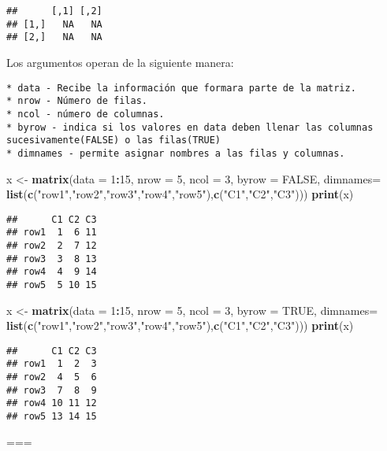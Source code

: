 \documentclass[11pt,]{article}
\newenvironment{Shaded}{\begin{snugshade}}{\end{snugshade}}
\newcommand{\DataTypeTok}[1]{\textcolor[rgb]{0.13,0.29,0.53}{#1}}
\newcommand{\DecValTok}[1]{\textcolor[rgb]{0.00,0.00,0.81}{#1}}
\newcommand{\KeywordTok}[1]{\textcolor[rgb]{0.13,0.29,0.53}{\textbf{#1}}}
\newcommand{\NormalTok}[1]{#1}
\newcommand{\OperatorTok}[1]{\textcolor[rgb]{0.81,0.36,0.00}{\textbf{#1}}}
\newcommand{\OtherTok}[1]{\textcolor[rgb]{0.56,0.35,0.01}{#1}}
\newcommand{\StringTok}[1]{\textcolor[rgb]{0.31,0.60,0.02}{#1}}
\begin{document}
\begin{verbatim}
##      [,1] [,2]
## [1,]   NA   NA
## [2,]   NA   NA
\end{verbatim}

Los argumentos operan de la siguiente manera:

\begin{verbatim}
* data - Recibe la información que formara parte de la matriz.
* nrow - Número de filas. 
* ncol - número de columnas.
* byrow - indica si los valores en data deben llenar las columnas sucesivamente(FALSE) o las filas(TRUE)
* dimnames - permite asignar nombres a las filas y columnas.
\end{verbatim}

\begin{Shaded}
\begin{Highlighting}[]
\NormalTok{x <-}\StringTok{ }\KeywordTok{matrix}\NormalTok{(}\DataTypeTok{data =} \DecValTok{1}\OperatorTok{:}\DecValTok{15}\NormalTok{, }\DataTypeTok{nrow =} \DecValTok{5}\NormalTok{, }\DataTypeTok{ncol =} \DecValTok{3}\NormalTok{, }\DataTypeTok{byrow =} \OtherTok{FALSE}\NormalTok{, }\DataTypeTok{dimnames=} \KeywordTok{list}\NormalTok{(}\KeywordTok{c}\NormalTok{(}\StringTok{"row1"}\NormalTok{,}\StringTok{"row2"}\NormalTok{,}\StringTok{"row3"}\NormalTok{,}\StringTok{"row4"}\NormalTok{,}\StringTok{"row5"}\NormalTok{),}\KeywordTok{c}\NormalTok{(}\StringTok{"C1"}\NormalTok{,}\StringTok{"C2"}\NormalTok{,}\StringTok{"C3"}\NormalTok{)))}
\KeywordTok{print}\NormalTok{(x)}
\end{Highlighting}
\end{Shaded}

\begin{verbatim}
##      C1 C2 C3
## row1  1  6 11
## row2  2  7 12
## row3  3  8 13
## row4  4  9 14
## row5  5 10 15
\end{verbatim}

\begin{Shaded}
\begin{Highlighting}[]
\NormalTok{x <-}\StringTok{ }\KeywordTok{matrix}\NormalTok{(}\DataTypeTok{data =} \DecValTok{1}\OperatorTok{:}\DecValTok{15}\NormalTok{, }\DataTypeTok{nrow =} \DecValTok{5}\NormalTok{, }\DataTypeTok{ncol =} \DecValTok{3}\NormalTok{, }\DataTypeTok{byrow =} \OtherTok{TRUE}\NormalTok{, }\DataTypeTok{dimnames=} \KeywordTok{list}\NormalTok{(}\KeywordTok{c}\NormalTok{(}\StringTok{"row1"}\NormalTok{,}\StringTok{"row2"}\NormalTok{,}\StringTok{"row3"}\NormalTok{,}\StringTok{"row4"}\NormalTok{,}\StringTok{"row5"}\NormalTok{),}\KeywordTok{c}\NormalTok{(}\StringTok{"C1"}\NormalTok{,}\StringTok{"C2"}\NormalTok{,}\StringTok{"C3"}\NormalTok{)))}
\KeywordTok{print}\NormalTok{(x)}
\end{Highlighting}
\end{Shaded}

\begin{verbatim}
##      C1 C2 C3
## row1  1  2  3
## row2  4  5  6
## row3  7  8  9
## row4 10 11 12
## row5 13 14 15
\end{verbatim}

===

\newpage
\singlespacing 
\end{document}
